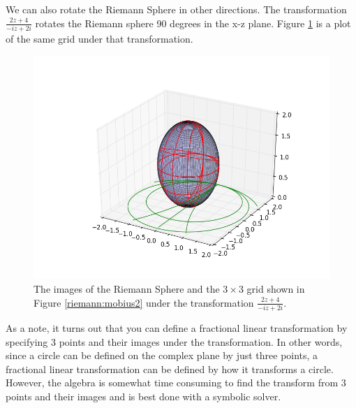 We can also rotate the Riemann Sphere in other directions.
The transformation $\frac{2z+4}{-iz+2i}$ rotates the Riemann sphere 90 degrees in the x-z plane.
Figure \ref{riemann:mobius5} is a plot of the same grid under that transformation.

\begin{figure}
\includegraphics[width=\textwidth]{mobius5.png}
\caption{The images of the Riemann Sphere and the $3\times 3$ grid shown in Figure \ref{riemann:mobius2} under the transformation $\frac{2z+4}{-iz+2i}$.}
\label{riemann:mobius5}
\end{figure}

As a note, it turns out that you can define a fractional linear transformation by specifying 3 points and their images under the transformation. In other words, since a circle can be defined on the complex plane by just three points, a fractional linear transformation can be defined by how it transforms a circle. However, the algebra is somewhat time consuming to find the transform from 3 points and their images and is best done with a symbolic solver.

